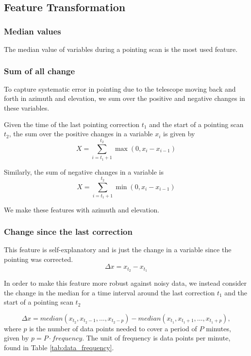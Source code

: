 \subsection{Feature Transformation} 
\subsubsection{Median values}
The median value of variables during a pointing scan is the most used feature.

\subsubsection{Sum of all change}
To capture systematic error in pointing due to the telescope moving back and forth in azimuth and elevation,
we sum over the positive and negative changes in these variables.

Given the time of the last pointing correction $t_1$ and the start of a pointing scan $t_2$, the sum over the positive changes in a variable $x_i$ is given by
\begin{equation}\label{eq:positive_int}
    X = \sum_{i=t_1+1}^{t_2} \max(0, x_i-x_{i-1})
\end{equation}

Similarly, the sum of negative changes in a variable is
\begin{equation}\label{eq:negative_int}
    X = \sum_{i=t_1+1}^{t_2} \min(0, x_i-x_{i-1})
\end{equation}

We make these features with azimuth and elevation.

\subsubsection{Change since the last correction}
This feature is self-explanatory and is just the change in a variable since the pointing was corrected.
\begin{equation}
    \Delta x = x_{t_2} - x_{t_1}
\end{equation}

In order to make this feature more robust against noisy data,
we instead consider the change in the median for a time interval around the last correction $t_1$ and the start of a pointing scan $t_2$

\begin{equation}
    \Delta x = \textit{median}(x_{t_2}, x_{t_2 - 1}, \dots, x_{t_2- p}) - \textit{median}(x_{t_1}, x_{t_1 + 1}, \dots, x_{t_1 + p}),
\end{equation}
where $p$ is the number of data points needed to cover a period of $P$ minutes, given by $p = P \cdot frequency$. The unit of frequency is data points per minute, found in Table \ref{tab:data_frequency}.

